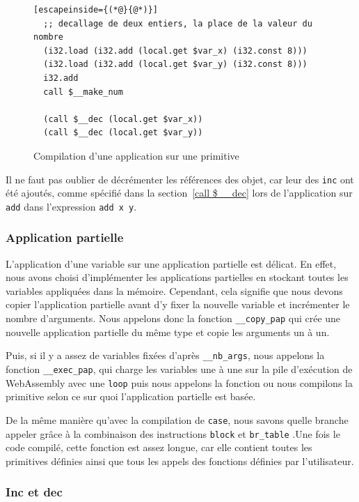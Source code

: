 \documentclass{rapportECL}
\begin{document}
\begin{figure}[H]
	\begin{lstlisting}[escapeinside={(*@}{@*)}]
  ;; decallage de deux entiers, la place de la valeur du nombre
  (i32.load (i32.add (local.get $var_x) (i32.const 8)))
  (i32.load (i32.add (local.get $var_y) (i32.const 8)))
  i32.add
  call $__make_num
  
  (call $__dec (local.get $var_x))
  (call $__dec (local.get $var_y))
	\end{lstlisting}
	\caption{Compilation d'une application sur une primitive}
	\label{listing:compile_add}
\end{figure}

Il ne faut pas oublier de décrémenter les références des objet, car leur des \verb|inc| ont été ajoutés, comme spécifié dans la 
section~\ref{call $__dec} lors de l'application sur \verb|add| dans l'expression \verb|add x y|.

\subsubsection{Application partielle}

L'application d'une variable sur une application partielle est délicat. En effet, nous avons choisi d'implémenter les applications 
partielles en stockant toutes les variables appliquées dans la mémoire. Cependant, cela signifie que nous devons copier l'application
partielle avant d'y fixer la nouvelle variable et incrémenter le nombre d'arguments. Nous appelons donc la fonction 
\verb|__copy_pap| qui crée une nouvelle application partielle du même type et copie les arguments un à un.

Puis, si il y a assez de variables fixées d'après \verb|__nb_args|, nous appelons la fonction \verb|__exec_pap|, qui charge les 
variables une à une sur la pile d'exécution de WebAssembly avec une \verb|loop| puis nous appelons la fonction ou nous compilons 
la primitive selon ce sur quoi l'application partielle est basée. 

De la même manière qu'avec la compilation de \verb|case|, nous savons quelle branche appeler grâce à la 
combinaison des instructions \verb|block| et \verb|br_table| .Une fois le code compilé, cette fonction est assez longue, 
car elle contient toutes les primitives définies ainsi que tous les appels des fonctions définies par l'utilisateur.

\subsubsection{Inc et dec}
\end{document}
